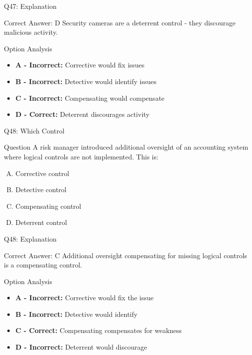 \documentclass{beamer}
\begin{document}
	\begin{frame}{Q47: Explanation}
		\begin{block}{Correct Answer: D}
			Security cameras are a deterrent control - they discourage malicious activity.
		\end{block}
		\begin{block}{Option Analysis}
			\begin{itemize}
				\item \textbf{A - Incorrect:} Corrective would fix issues
				\item \textbf{B - Incorrect:} Detective would identify issues
				\item \textbf{C - Incorrect:} Compensating would compensate
				\item \textbf{D - Correct:} Deterrent discourages activity
			\end{itemize}
		\end{block}
	\end{frame}
	
	\begin{frame}{Q48: Which Control}
		\begin{block}{Question}
			A risk manager introduced additional oversight of an accounting system where logical controls are not implemented. This is:
		\end{block}
		\begin{enumerate}[(A)]
			\item Corrective control
			\item Detective control
			\item Compensating control
			\item Deterrent control
		\end{enumerate}
	\end{frame}
	
	\begin{frame}{Q48: Explanation}
		\begin{block}{Correct Answer: C}
			Additional oversight compensating for missing logical controls is a compensating control.
		\end{block}
		\begin{block}{Option Analysis}
			\begin{itemize}
				\item \textbf{A - Incorrect:} Corrective would fix the issue
				\item \textbf{B - Incorrect:} Detective would identify
				\item \textbf{C - Correct:} Compensating compensates for weakness
				\item \textbf{D - Incorrect:} Deterrent would discourage
			\end{itemize}
		\end{block}
	\end{frame}
	
\end{document}
